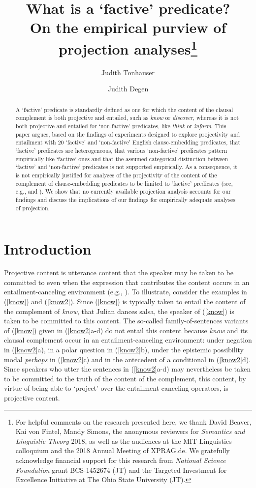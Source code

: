 \documentclass[11pt,fleqn]{article}
\title{What is a `factive' predicate? \\ On the empirical purview of projection analyses\thanks{For helpful comments on the research presented here, we thank David Beaver, Kai von Fintel, Mandy Simons, the anonymous reviewers for {\em Semantics and Linguistic Theory} 2018, as well as the audiences at the MIT Linguistics colloquium and the 2018 Annual Meeting of XPRAG.de. We gratefully acknowledge financial support for this research from {\em National Science Foundation} grant BCS-1452674 (JT) and the Targeted Investment for Excellence Initiative at The Ohio State University (JT).}}
\author[$\circ$]{Judith Tonhauser}
\author[$\bullet$]{Judith Degen}
\affil[$\circ$]{The Ohio State University / University of Stuttgart}
\affil[$\bullet$]{Stanford University}
\newcommand{\6}{\mbox{$[\hspace*{-.6mm}[$}}
\newcommand{\9}{\mbox{$]\hspace*{-.6mm}]$}}
\begin{document}

\maketitle


\begin{abstract}

A `factive' predicate is standardly defined as one for which the content of the clausal complement is both projective and entailed, such as {\em know} or {\em discover}, whereas it is not both projective and entailed for `non-factive' predicates, like {\em think} or {\em inform}. This paper argues, based on the findings of experiments designed to explore projectivity and entailment with 20 `factive' and `non-factive' English clause-embedding predicates, that `factive' predicates are heterogeneous, that various `non-factive' predicates pattern empirically like `factive' ones  and that the assumed categorical distinction between `factive' and `non-factive' predicates is not supported empirically. As a consequence, it is not empirically justified for analyses of the projectivity of the content of the complement of clause-embedding predicates to be limited to `factive' predicates (see, e.g., \citealt{heim83,vds92,abrusan2011,abrusan2016,romoli2015} and \citealt{best-question}). We show that no currently available projection analysis accounts for our findings and discuss the implications of our findings for empirically adequate analyses of projection.

\end{abstract}
			
\section{Introduction}\label{s1}

Projective content is utterance content that the speaker may be taken to be committed to even when the expression that contributes the content occurs in an entailment-canceling environment (e.g., \citealt{brst-salt10,brst-lang11,tbd-variability}). To illustrate, consider the examples in (\ref{know}) and (\ref{know2}). Since (\ref{know}) is typically taken to entail the content of the complement of {\em know}, that Julian dances salsa, the speaker of (\ref{know}) is taken to be committed to this content. The so-called family-of-sentences variants of (\ref{know}) given in (\ref{know2}a-d) do not entail this content because {\em know} and its clausal complement occur in an entailment-canceling environment: under negation in (\ref{know2}a), in a polar question in (\ref{know2}b), under the epistemic possibility modal {\em perhaps} in (\ref{know2}c) and in the antecedent of a conditional in (\ref{know2}d). Since speakers who utter the sentences in (\ref{know2}a-d) may nevertheless be taken to be committed to the truth of the content of the complement, this content, by virtue of being able to `project' over the entailment-canceling operators, is projective content. 
\end{document}

